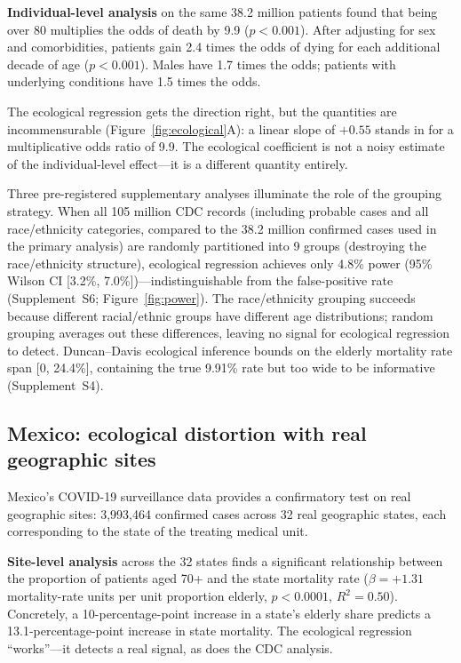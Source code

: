 \documentclass[11pt]{article}
\begin{document}
\textbf{Individual-level analysis} on the same 38.2 million patients found
that being over 80 multiplies the odds of death by 9.9 ($p < 0.001$).
After adjusting for sex and comorbidities, patients gain 2.4 times the odds of
dying for each additional decade of age ($p < 0.001$).  Males have 1.7
times the odds; patients with underlying conditions have 1.5 times the odds.

The ecological regression gets the direction right, but the quantities are
incommensurable (Figure~\ref{fig:ecological}A): a linear slope of $+0.55$
stands in for a multiplicative odds ratio of 9.9.  The ecological
coefficient is not a noisy estimate of the individual-level effect---it is a
different quantity entirely.

Three pre-registered supplementary analyses illuminate the role of the
grouping strategy.  When all 105 million CDC records (including probable
cases and all race/ethnicity categories, compared to the 38.2 million
confirmed cases used in the primary analysis) are randomly
partitioned into 9 groups (destroying the race/ethnicity structure),
ecological regression achieves only 4.8\% power (95\% Wilson CI
[3.2\%, 7.0\%])---indistinguishable from the false-positive rate
(Supplement~S6; Figure~\ref{fig:power}).  The race/ethnicity grouping
succeeds because different racial/ethnic groups have different age
distributions; random grouping averages out these differences, leaving no
signal for ecological regression to detect.  Duncan--Davis ecological
inference bounds on the elderly mortality rate span [0, 24.4\%], containing
the true 9.91\% rate but too wide to be informative (Supplement~S4).


\subsection{Mexico: ecological distortion with real geographic sites}

Mexico's COVID-19 surveillance data provides a confirmatory test on real
geographic sites: 3,993,464 confirmed cases across
32 real geographic states, each corresponding to the state of the treating
medical unit.

\textbf{Site-level analysis} across the 32 states finds a significant
relationship between the proportion of patients aged 70+ and the state
mortality rate ($\beta = +1.31$ mortality-rate units per unit proportion
elderly, $p < 0.0001$, $R^2 = 0.50$).  Concretely, a 10-percentage-point
increase in a state's elderly share predicts a 13.1-percentage-point
increase in state mortality.  The ecological regression
``works''---it detects a real signal, as does the CDC analysis.
\end{document}
